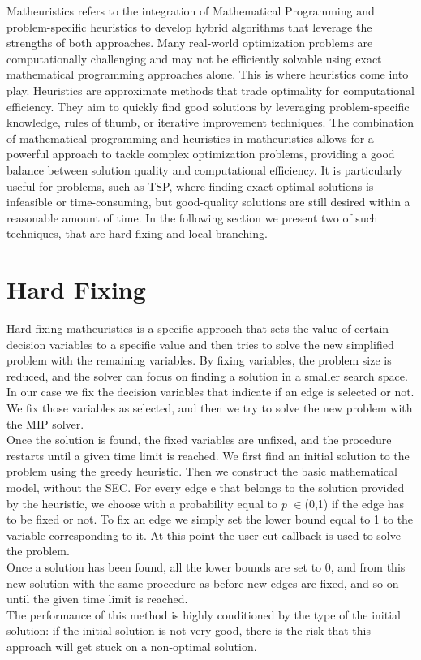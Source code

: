 Matheuristics refers to the integration of Mathematical Programming and problem-specific heuristics to develop hybrid algorithms that leverage the strengths of both approaches. Many real-world optimization problems are computationally challenging and may not be efficiently solvable using exact mathematical programming approaches alone. This is where heuristics come into play. Heuristics are approximate methods that trade optimality for computational efficiency. They aim to quickly find good solutions by leveraging problem-specific knowledge, rules of thumb, or iterative improvement techniques.
The combination of mathematical programming and heuristics in matheuristics allows for a powerful approach to tackle complex optimization problems, providing a good balance between solution quality and computational efficiency. It is particularly useful for problems, such as TSP, where finding exact optimal solutions is infeasible or time-consuming, but good-quality solutions are still desired within a reasonable amount of time.
In the following section we present two of such techniques, that are hard fixing and local branching.

\section{Hard Fixing}
Hard-fixing matheuristics is a specific approach that sets the value of certain decision variables to a specific value and then tries to solve the new simplified problem with the remaining variables. By fixing variables, the problem size is reduced, and the solver can focus on finding a solution in a smaller search space.\\
In our case we fix the decision variables that indicate if an edge is selected or not. We fix those variables as selected, and then we try to solve the new problem with the MIP solver.\\
Once the solution is found, the fixed variables are unfixed, and the procedure restarts until a given time limit is reached.
We first find an initial solution to the problem using the greedy heuristic. Then we construct the basic mathematical model, without the SEC. For every edge e that belongs to the solution provided by the heuristic, we choose with a probability equal to \textit{p} $\in$(0,1) if the edge has to be fixed or not. To fix an edge we simply set the lower bound equal to 1 to the variable corresponding to it. At this point the user-cut callback is used to solve the problem.\\ 
Once a solution has been found, all the lower bounds are set to 0, and from this new solution with the same procedure as before new edges are fixed, and so on until the given time limit is reached.\\
The performance of this method is highly conditioned by the type of the initial solution: if the initial solution is not very good, there is the risk that this approach will get stuck on a non-optimal solution.


